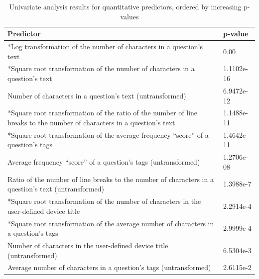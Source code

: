 \documentclass{article}
\begin{document}
\begin{table}[!htbp]
\centering
\caption{Univariate analysis results for quantitative predictors, ordered by increasing p-values} 
\begin{tabular}{|p{12cm}|p{2cm}|}
  \hline
  Predictor & p-value \\ 
  \hline \hline
  *Log transformation of the number of characters in a question's text & 0.00 \\ 
  \hline
  *Square root transformation of the number of characters in a question's text & 1.1102e-16 \\ 
  \hline
  Number of characters in a question's text (untransformed) & 6.9472e-12 \\
  \hline
  *Square root transformation of the ratio of the number of line breaks to the number of characters in a question's text & 1.1488e-11 \\ 
  \hline
  *Square root transformation of the average frequency ``score'' of a question's tags & 1.4642e-11 \\ 
  \hline
  Average frequency ``score'' of a question's tags (untransformed) & 1.2706e-08 \\ 
  \hline
  Ratio of the number of line breaks to the number of characters in a question's text (untransformed) & 1.3988e-7 \\ 
  \hline
  *Square root transformation of the number of characters in the user-defined device title & 2.2914e-4 \\ 
  \hline
  *Square root transformation of the average number of characters in a question's tags & 2.9999e-4 \\ 
  \hline
  Number of characters in the user-defined device title (untransformed) & 6.5304e-3 \\ 
  \hline
  Average number of characters in a question's tags (untransformed) & 2.6115e-2 \\ 
   \hline
\end{tabular}
\label{table:qresults}
\end{table}
\end{document}

